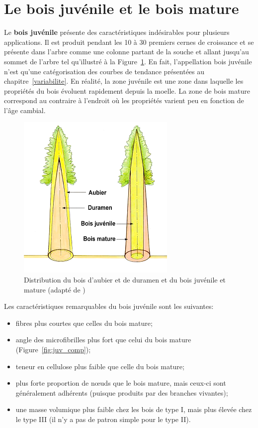 \section{Le bois juvénile et le bois mature}

Le \textbf{bois juvénile} présente des caractéristiques indésirables pour plusieurs applications. Il est produit pendant les 10 à 30 premiers cernes  de croissance et se présente dans l'arbre comme une colonne partant de la souche et allant jusqu'au sommet de l'arbre tel qu'illustré à la Figure~\ref{fig:juv_aubier}. En fait, l'appellation \og bois juvénile \fg n'est qu'une catégorisation des courbes de tendance présentées au chapitre~\ref{variabilite}. En réalité, la zone juvénile est une zone dans laquelle les propriétés du bois évoluent rapidement depuis la moelle. La zone de bois mature correspond au contraire à l'endroit où les propriétés varient peu en fonction de l'âge cambial.\\

\begin{figure}[!h]
	\centering
	\includegraphics[width=0.5\linewidth]{./img/ch8_juv_aubier}
	\caption{Distribution du bois d’aubier et de duramen et du bois juvénile et mature (adapté de \cite{jozsa1994discussion})}
	\label{fig:juv_aubier}
\end{figure}

Les caractéristiques remarquables du bois juvénile sont les suivantes:

\begin{itemize}
	\item fibres plus courtes que celles du bois mature;
	\item angle des microfibrilles plus fort que celui du bois mature (Figure~\ref{fig:juv_comp});
	\item teneur en cellulose plus faible que celle du bois mature;
	\item plus forte proportion de nœuds que le bois mature, mais ceux-ci sont généralement adhérents (puisque produits par des branches vivantes);
	\item une masse volumique plus faible chez les bois de type I, mais plus élevée chez le type III (il n'y a pas de patron simple pour le type II). 
\end{itemize}

